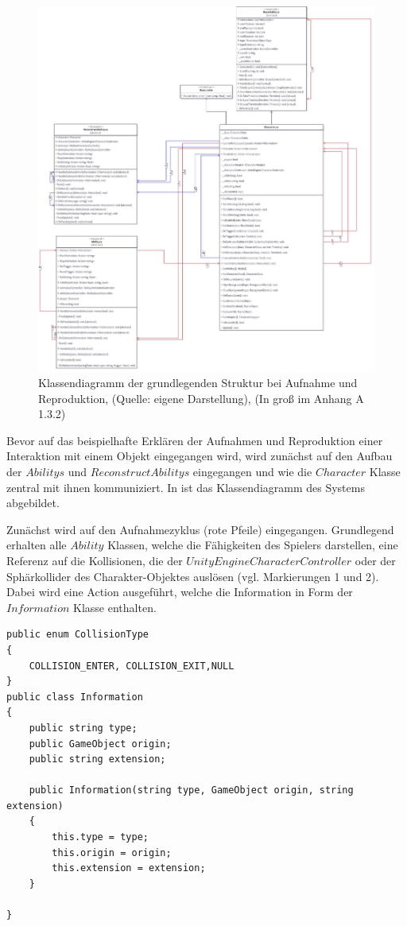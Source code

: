 \begin{figure}[p]
\centering
\includegraphics[width=1\linewidth]{content/pictures/Interaction_Reconstruct_class.jpg}
\caption{Klassendiagramm der grundlegenden Struktur bei Aufnahme und Reproduktion, (Quelle: eigene Darstellung), (In groß im Anhang A 1.3.2)}
\label{fig:record_reconstruct_class}
\end{figure}

Bevor auf das beispielhafte Erklären der Aufnahmen und Reproduktion einer Interaktion mit einem Objekt eingegangen wird, wird zunächst auf den Aufbau der $Abilitys$ und $ReconstructAbilitys$ eingegangen und wie die $Character$ Klasse zentral mit ihnen kommuniziert. In  ist das Klassendiagramm des Systems abgebildet.

Zunächst wird auf den Aufnahmezyklus (rote Pfeile) eingegangen. Grundlegend erhalten alle $Ability$ Klassen, welche die Fähigkeiten des Spielers darstellen, eine Referenz auf die Kollisionen, die der $UnityEngine CharacterController$ oder der Sphärkollider des Charakter-Objektes auslösen (vgl. Markierungen 1 und 2). Dabei wird eine Action ausgeführt, welche die Information in Form der $Information$ Klasse enthalten.
\begin{lstlisting}[caption={Information.cs des Prototyps}, label={fig:information-cs}]
public enum CollisionType
{
    COLLISION_ENTER, COLLISION_EXIT,NULL
}
public class Information
{
    public string type;
    public GameObject origin;
    public string extension;

    public Information(string type, GameObject origin, string extension)
    {
        this.type = type;
        this.origin = origin;
        this.extension = extension;
    }

}
\end{lstlisting}

